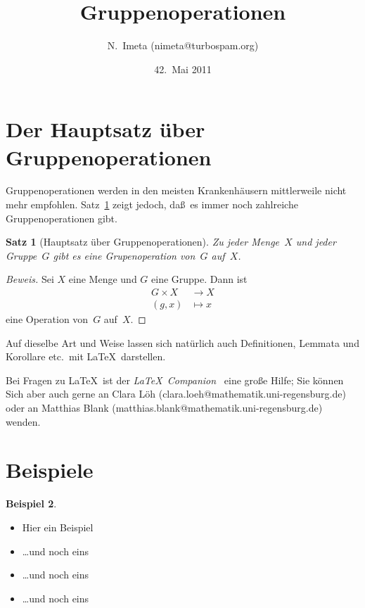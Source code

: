 \documentclass[a4paper,twoside,DIV8,10pt]{scrartcl}
\author{N.~Imeta (\textsf{nimeta@turbospam.org})}
\date{42.~Mai 2011}
\title{Gruppenoperationen%
    \blfootnote{Seminar/Hauptseminar \glqq Amenable Gruppen\grqq, 
      SS~2011, Universit\"at Regensburg}}
\newtheorem{satz}{Satz}[section]
\theoremstyle{definition}
\newenvironment{beweis}%
    {\begin{proof}[Beweis]}
    {\end{proof}}
\newtheorem{beispiel}[satz]{Beispiel}
\begin{document}
  \maketitle

  \begin{abstract}
    \noindent
      
  \end{abstract}

  \section{Der Hauptsatz \"uber Gruppenoperationen}

  Gruppenoperationen werden in den meisten Krankenh\"ausern mittlerweile
  nicht mehr empfohlen. Satz~\ref{hauptsatz} zeigt jedoch, da\ss\
  es immer noch zahlreiche Gruppenoperationen gibt.
  
  \begin{satz}[Hauptsatz \"uber Gruppenoperationen]\label{hauptsatz}
    Zu jeder Menge~$X$ und jeder Gruppe~$G$ gibt es eine
    Grupenoperation von~$G$ auf~$X$.
  \end{satz}
  \begin{beweis}
    Sei $X$ eine Menge und $G$ eine Gruppe. Dann ist
    \begin{align*}
      G \times X & \longrightarrow X \\
      (g,x)      & \longmapsto     x
    \end{align*}
    eine Operation von~$G$ auf~$X$.
  \end{beweis}

  Auf dieselbe Art und Weise lassen sich nat\"urlich auch
  Definitionen, Lemmata und Korollare etc.\ mit \LaTeX\ darstellen.

  Bei Fragen zu \LaTeX\ ist der \emph{\LaTeX\ Companion}~\cite{companion} 
  eine gro\ss e Hilfe; Sie k\"onnen Sich aber auch gerne an Clara
  L\"oh (\textsf{clara.loeh@mathematik.uni-regensburg.de}) oder an 
  Matthias Blank (\textsf{matthias.blank@mathematik.uni-regensburg.de}) 
  wenden.

  \section{Beispiele}

  \begin{beispiel}
    \hfil
    \begin{itemize}
      \item Hier ein Beispiel 
      \item \dots und noch eins
      \item \dots und noch eins
      \item \dots und noch eins
    \end{itemize}
  \end{beispiel}
\end{document}
